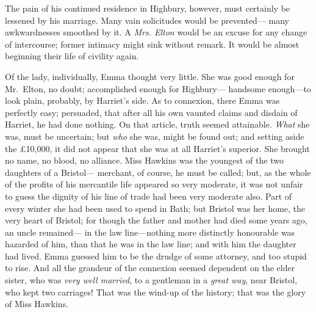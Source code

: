 The pain of his continued residence in Highbury, however, must certainly
be lessened by his marriage.  Many vain solicitudes would be prevented---%
many awkwardnesses smoothed by it.  A \emph{Mrs. Elton} would be an excuse for
any change of intercourse; former intimacy might sink without remark.
It would be almost beginning their life of civility again.

Of the lady, individually, Emma thought very little.  She was good
enough for Mr.\ Elton, no doubt; accomplished enough for Highbury---%
handsome enough---to look plain, probably, by Harriet's side.
As to connexion, there Emma was perfectly easy; persuaded,
that after all his own vaunted claims and disdain of Harriet,
he had done nothing.  On that article, truth seemed attainable.
\emph{What} she was, must be uncertain; but \emph{who} she was, might be found out;
and setting aside the \pounds 10,000, it did not appear that she was at
all Harriet's superior.  She brought no name, no blood, no alliance.
Miss Hawkins was the youngest of the two daughters of a Bristol---%
merchant, of course, he must be called; but, as the whole of the
profits of his mercantile life appeared so very moderate, it was
not unfair to guess the dignity of his line of trade had been very
moderate also.  Part of every winter she had been used to spend in Bath;
but Bristol was her home, the very heart of Bristol; for though
the father and mother had died some years ago, an uncle remained---%
in the law line---nothing more distinctly honourable was hazarded
of him, than that he was in the law line; and with him the daughter
had lived.  Emma guessed him to be the drudge of some attorney,
and too stupid to rise.  And all the grandeur of the connexion
seemed dependent on the elder sister, who was \emph{very well married},
to a gentleman in a \emph{great way}, near Bristol, who kept two carriages!
That was the wind-up of the history; that was the glory of
Miss Hawkins.

